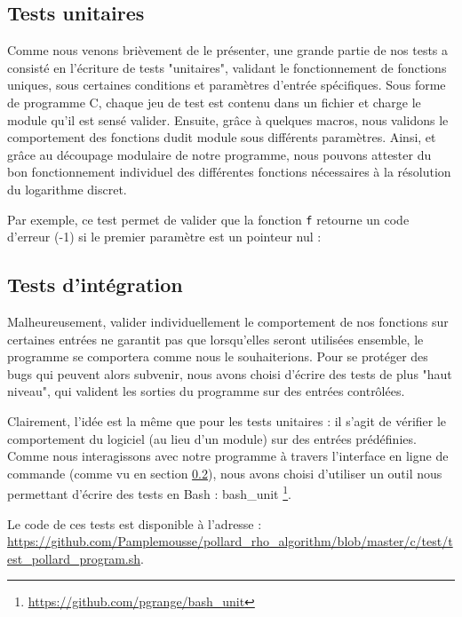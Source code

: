       \subsection{Tests unitaires}
      Comme nous venons brièvement de le présenter, une grande partie de nos tests a consisté en l'écriture de tests "unitaires", validant le fonctionnement de fonctions uniques, sous certaines conditions et paramètres d'entrée spécifiques.
      Sous forme de programme C, chaque jeu de test est contenu dans un fichier et charge le module qu'il est sensé valider. Ensuite, grâce à quelques macros, nous validons le comportement des fonctions dudit module sous différents paramètres.
      Ainsi, et grâce au découpage modulaire de notre programme, nous pouvons attester du bon fonctionnement individuel des différentes fonctions nécessaires à la résolution du logarithme discret.

      Par exemple, ce test permet de valider que la fonction \lstinline{f} retourne un code d'erreur (-1) si le premier paramètre est un pointeur nul :

      


      \subsection{Tests d'intégration}
      Malheureusement, valider individuellement le comportement de nos fonctions sur certaines entrées ne garantit pas que lorsqu'elles seront utilisées ensemble, le programme se comportera comme nous le souhaiterions.
      Pour se protéger des bugs qui peuvent alors subvenir, nous avons choisi d'écrire des tests de plus "haut niveau", qui valident les sorties du programme sur des entrées contrôlées.

      Clairement, l'idée est la même que pour les tests unitaires : il s'agit de vérifier le comportement du logiciel (au lieu d'un module) sur des entrées prédéfinies. Comme nous interagissons avec notre programme à travers l'interface en ligne de commande (comme vu en section \ref{}), nous avons choisi d'utiliser un outil nous permettant d'écrire des tests en Bash : bash\_unit \footnote{\url{https://github.com/pgrange/bash_unit}}.

      \begin{sloppypar}
        Le code de ces tests est disponible à l'adresse : \url{https://github.com/Pamplemousse/pollard_rho_algorithm/blob/master/c/test/test_pollard_program.sh}.
      \end{sloppypar}

